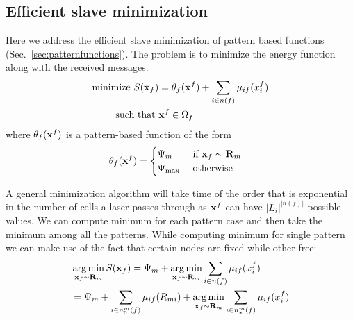 \documentclass[letterpaper, 10 pt, conference]{ieeeconf} %
\DeclareMathOperator*{\argmin}{arg\,min}
\newcommand{\vect}[1]{\mathbf{#1}}
\begin{document}
\subsection{Efficient slave minimization}
Here we address the efficient slave minimization of pattern based functions (Sec.~\ref{sec:patternfunctions}). 
The problem is to minimize the energy function along with the received messages.
\begin{equation}
  \begin{split}
    \text{minimize }  S(\map_f) &=\theta_f(\map^f) + \sum_{i \in n(f)}\msg{i}{f}{x_i^f} \\
   \text{such that }  &\map^f \in \Omega_f
  \end{split}
\end{equation}
where $\theta_f(\map^f)$ is a pattern-based function of the form
\begin{align}
  \theta_f(\map^f) &= \begin{cases}
                \Psi_m & \text{ if $\map_f \sim \vect{R}_m$}\\
     \Psi_{\text{max}} & \text{ otherwise}
  \end{cases}
\end{align}

A general minimization algorithm will take time of the order that is
exponential in the number of cells a laser passes through as $\map^f$ can
have $|L_i|^{|n(f)|}$ possible values.
We can compute minimum for each pattern case and then take the minimum among all the patterns. While computing minimum for single pattern we can make use of the fact that certain nodes are fixed while other free:
\begin{align}
  &\argmin_{\map_f \sim \vect{R}_m} S(\map_f) 
  = \Psi_m + \argmin_{\map_f \sim \vect{R}_m} \sum_{i \in n(f)}\msg{i}{f}{x_i^f}\\
  &= \Psi_m + \sum_{i \in n^m_0(f)}\msg{i}{f}{R_{mi}} 
  + \argmin_{\map_f \sim \vect{R}_m} \sum_{i \in n^m_*(f)}\msg{i}{f}{x_i^f}
\end{align}
\end{document}
